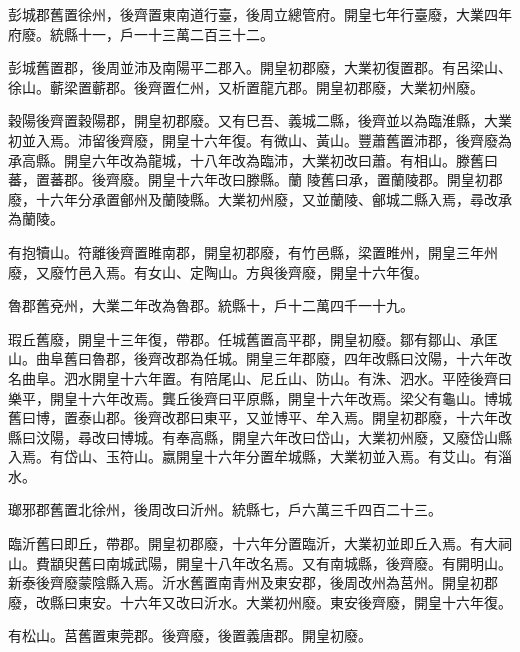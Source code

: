 
\begin{pinyinscope}

 彭城郡舊置徐州，後齊置東南道行臺，後周立總管府。開皇七年行臺廢，大業四年府廢。統縣十一，戶一十三萬二百三十二。



 彭城舊置郡，後周並沛及南陽平二郡入。開皇初郡廢，大業初復置郡。有呂梁山、徐山。蘄梁置蘄郡。後齊置仁州，又析置龍亢郡。開皇初郡廢，大業初州廢。



 穀陽後齊置穀陽郡，開皇初郡廢。又有巳吾、義城二縣，後齊並以為臨淮縣，大業初並入焉。沛留後齊廢，開皇十六年復。有微山、黃山。豐蕭舊置沛郡，後齊廢為承高縣。開皇六年改為龍城，十八年改為臨沛，大業初改曰蕭。有相山。滕舊曰蕃，置蕃郡。後齊廢。開皇十六年改曰滕縣。蘭
 陵舊曰承，置蘭陵郡。開皇初郡廢，十六年分承置鄶州及蘭陵縣。大業初州廢，又並蘭陵、鄶城二縣入焉，尋改承為蘭陵。



 有抱犢山。符離後齊置睢南郡，開皇初郡廢，有竹邑縣，梁置睢州，開皇三年州廢，又廢竹邑入焉。有女山、定陶山。方與後齊廢，開皇十六年復。



 魯郡舊兗州，大業二年改為魯郡。統縣十，戶十二萬四千一十九。



 瑕丘舊廢，開皇十三年復，帶郡。任城舊置高平郡，開皇初廢。鄒有鄒山、承匡山。曲阜舊曰魯郡，後齊改郡為任城。開皇三年郡廢，四年改縣曰汶陽，十六年改名曲阜。泗水開皇十六年置。有陪尾山、尼丘山、防山。有洙、泗水。平陸後齊曰樂平，開皇十六年改焉。龔丘後齊曰平原縣，開皇十六年改焉。梁父有龜山。博城舊曰博，置泰山郡。後齊改郡曰東平，又並博平、牟入焉。開皇初郡廢，十六年改縣曰汶陽，尋改曰博城。有奉高縣，開皇六年改曰岱山，大業初州廢，又廢岱山縣入焉。有岱山、玉符山。嬴開皇十六年分置牟城縣，大業初並入焉。有艾山。有淄水。



 瑯邪郡舊置北徐州，後周改曰沂州。統縣七，戶六萬三千四百二十三。



 臨沂舊曰即丘，帶郡。開皇初郡廢，十六年分置臨沂，大業初並即丘入焉。有大祠山。費顓臾舊曰南城武陽，開皇十八年改名焉。又有南城縣，後齊廢。有開明山。新泰後齊廢蒙陰縣入焉。沂水舊置南青州及東安郡，後周改州為莒州。開皇初郡廢，改縣曰東安。十六年又改曰沂水。大業初州廢。東安後齊廢，開皇十六年復。



 有松山。莒舊置東莞郡。後齊廢，後置義唐郡。開皇初廢。




\end{pinyinscope}
